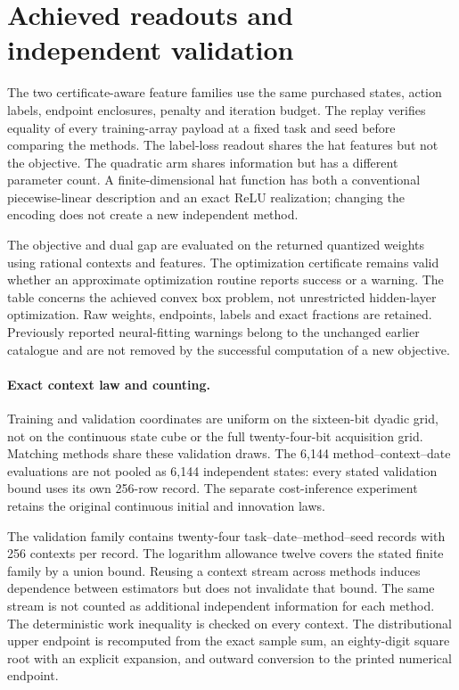 \section{Achieved readouts and independent validation}\label{supp:training70}
The two certificate-aware feature families use the same purchased states, action labels, endpoint enclosures, penalty and iteration budget. The replay verifies equality of every training-array payload at a fixed task and seed before comparing the methods. The label-loss readout shares the hat features but not the objective. The quadratic arm shares information but has a different parameter count. A finite-dimensional hat function has both a conventional piecewise-linear description and an exact ReLU realization; changing the encoding does not create a new independent method.


The objective and dual gap are evaluated on the returned quantized weights using rational contexts and features. The optimization certificate remains valid whether an approximate optimization routine reports success or a warning. The table concerns the achieved convex box problem, not unrestricted hidden-layer optimization. Raw weights, endpoints, labels and exact fractions are retained. Previously reported neural-fitting warnings belong to the unchanged earlier catalogue and are not removed by the successful computation of a new objective.

\paragraph{Exact context law and counting.}
Training and validation coordinates are uniform on the sixteen-bit dyadic grid, not on the continuous state cube or the full twenty-four-bit acquisition grid. Matching methods share these validation draws. The 6,144 method--context--date evaluations are not pooled as 6,144 independent states: every stated validation bound uses its own 256-row record. The separate cost-inference experiment retains the original continuous initial and innovation laws.


The validation family contains twenty-four task--date--method--seed records with 256 contexts per record. The logarithm allowance twelve covers the stated finite family by a union bound. Reusing a context stream across methods induces dependence between estimators but does not invalidate that bound. The same stream is not counted as additional independent information for each method. The deterministic work inequality is checked on every context. The distributional upper endpoint is recomputed from the exact sample sum, an eighty-digit square root with an explicit expansion, and outward conversion to the printed numerical endpoint.

